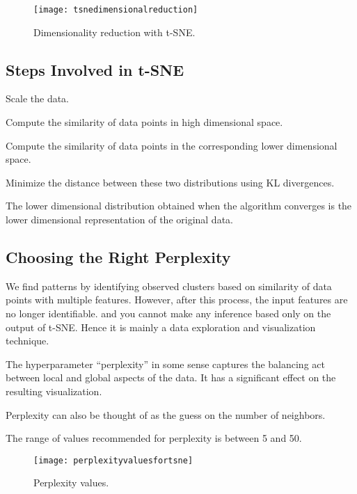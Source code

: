  	\begin{figure}[htb]
		\centering
		\texttt{[image: tsnedimensionalreduction]}
		\caption[Dimensionality reduction with t-SNE]{Dimensionality reduction with t-SNE.}
		\label{fig:tsnedimensionalreduction}
	\end{figure}

	\subsection{Steps Involved in t-SNE}
	\begin{bulletedlist}
		\item Scale the data.
		\item Compute the similarity of data points in high dimensional space.
		\item Compute the similarity of data points in the corresponding lower dimensional space.
		\item Minimize the distance between these two distributions using KL divergences.
		\item The lower dimensional distribution obtained when the algorithm converges is the lower dimensional representation of the original data.
	\end{bulletedlist}

	\subsection{Choosing the Right Perplexity}
	\begin{bulletedlist}
		\item We find patterns by identifying observed clusters based on similarity of data points with multiple features.  However, after this process, the input features are no longer identifiable. and you cannot make any inference based only on the output of t-SNE.  Hence it is mainly a data exploration and visualization technique.
		\item The hyperparameter ``perplexity'' in some sense captures the balancing act between local and global aspects of the data.  It has a significant effect on the resulting visualization.
		\item Perplexity can also be thought of as the guess on the number of neighbors.
		\item The range of values recommended for perplexity is between 5 and 50.
	\end{bulletedlist}

 	\begin{figure}[htb]
		\centering
		\texttt{[image: perplexityvaluesfortsne]}
		\caption[Perplexity values]{Perplexity values.}
		\label{fig:perplexityvaluesfortsne}
	\end{figure}

